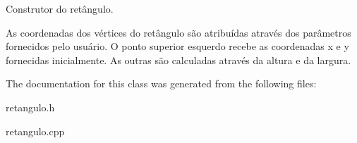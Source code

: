 Construtor do retângulo. 

As coordenadas dos vértices do retângulo são atribuídas através dos parâmetros fornecidos pelo usuário. O ponto superior esquerdo recebe as coordenadas x e y fornecidas inicialmente. As outras são calculadas através da altura e da largura. 

The documentation for this class was generated from the following files\+:\begin{DoxyCompactItemize}
\item 
retangulo.\+h\item 
retangulo.\+cpp\end{DoxyCompactItemize}
